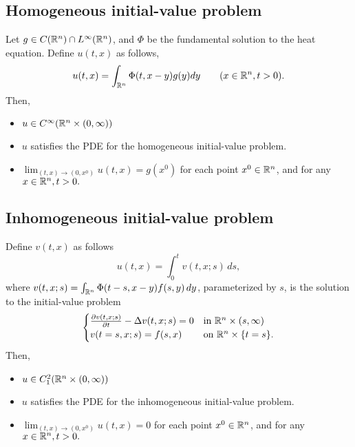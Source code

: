 \documentclass[oneside,a4paper,11pt]{report}
\begin{document}
\subsection{Homogeneous initial-value problem}
Let $g \in C({\mathbb{R}^n})\cap L^\infty({\mathbb{R}^n})$, and $\Phi$ be the fundamental solution to the heat equation. Define $u(t,x)$ as follows,
\[u(t,x) = \int_{{\mathbb{R}^n}}\Phi(t,x-y)g(y)dy \qquad (x \in {\mathbb{R}^n}, t > 0). \]
Then,
\begin{itemize}
\item $u \in C^\infty({\mathbb{R}^n} \times (0,\infty))$
\item $u$ satisfies the PDE for the homogeneous initial-value problem.
\item $\lim_{(t,x) \to (0,x^0)} u(t,x) = g(x^0)$ for each point $x^0 \in {\mathbb{R}^n}$, and for any $x\in {\mathbb{R}^n}, t > 0.$
\end{itemize}

\subsection{Inhomogeneous initial-value problem}
Define $v(t,x)$ as follows 
\[u(t,x) = \int_0^t v(t,x;s)\,ds,\] 
where $v(t,x;s) = \int_{{\mathbb{R}^n}} \Phi(t-s,x-y)f(s,y)\,dy$, parameterized by $s$, is the solution to the initial-value problem
\[ \begin{cases}
\frac{\partial v(t,x;s)}{\partial t} - \Delta v(t,x;s) = 0 & \text{in } {\mathbb{R}^n} \times  (s,\infty)\\
v(t=s,x;s) = f(s,x) & \text{on } {\mathbb{R}^n} \times \{t=s\}.
\end{cases}\]
Then,
\begin{itemize}
\item $u \in C_1^2({\mathbb{R}^n} \times (0,\infty))$
\item $u$ satisfies the PDE for the inhomogeneous initial-value problem.
\item $\lim_{(t,x) \to (0,x^0)} u(t,x) = 0$ for each point $x^0 \in {\mathbb{R}^n}$, and for any $x\in {\mathbb{R}^n}, t > 0.$
\end{itemize}

\end{document}
